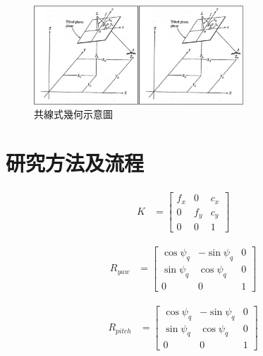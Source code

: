\documentclass[12pt]{article}       %
\renewcommand{\figurename}{圖}                           %
\begin{document}
\begin{figure}[htbp]
    \centering
    \renewcommand{\figurename}{圖}                              %
    \includegraphics[width=0.7\textwidth]{ce.jpg}         %
    \caption{共線式幾何示意圖\cite{tsao2018}}           %
    \label{fig:ce}                                        %
\end{figure}

\section{\centering 研究方法及流程}
\hspace{2em}


\begin{align}
    K &=
    \begin{bmatrix}
        f_{x}       & 0             & c_{x}     \\
        0           & f_{y}         & c_{y}     \\
        0           & 0             & 1
    \end{bmatrix} 
    \label{eq:k}
\end{align}

\begin{align}
    R_{yaw} &=
    \begin{bmatrix}
        \cos\psi_{q}   & -\sin\psi_{q}  & 0 \\
        \sin\psi_{q}   & \cos\psi_{q}   & 0 \\
        0              & 0              & 1
    \end{bmatrix} 
    \label{eq:ryaw}
\end{align}

\begin{align}
    R_{pitch} &=
    \begin{bmatrix}
        \cos\psi_{q}   & -\sin\psi_{q}  & 0 \\
        \sin\psi_{q}   & \cos\psi_{q}   & 0 \\
        0              & 0              & 1
    \end{bmatrix} 
    \label{eq:rpitch}
\end{align}
\end{document}
